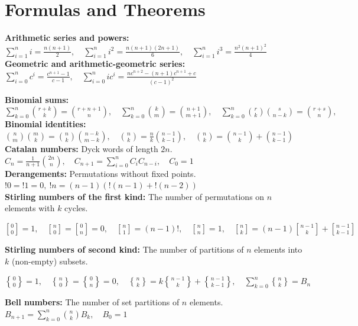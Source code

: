 \documentclass[a4paper,twocolumn]{article}
\newcommand{\stirling}[2]{{#1 \brack #2}}
\newcommand{\stirlingtwo}[2]{{#1 \brace #2}}
\newcommand\disappearingrule{%
	\par %
	\vskip5pt %
	\leaders\vrule width 0.4934\textwidth\vskip0.4pt %
	\nointerlineskip %
	\vskip2pt %
}
\begin{document}
\section{Formulas and Theorems}
{\fontsize{8}{8}

\textbf{Arithmetic series and powers:} $\sum\limits_{i=1}^n i = \frac{n(n+1)}{2}, \quad \sum\limits_{i=1}^n i^2 = \frac{n(n+1)(2n+1)}{6}, \quad \sum\limits_{i=1}^n i^3 = \frac{n^2(n+1)^2}{4}$ \\
\textbf{Geometric and arithmetic-geometric series: } $\sum\limits_{i=0}^n c^i = \frac{c^{n+1} - 1}{c-1}, \quad \sum\limits_{i=0}^n ic^i = \frac{nc^{n+2} - (n+1)c^{n+1} + c}{(c-1)^2}$

\disappearingrule

\textbf{Binomial sums: } $\sum\limits_{k=0}^n \binom{r+k}{k} = \binom{r+n+1}{n}, \quad \sum\limits_{k=0}^n \binom{k}{m} = \binom{n+1}{m+1}, \quad \sum\limits_{k=0}^n \binom{r}{k}\binom{s}{n-k} = \binom{r+s}{n},$ \\
\textbf{Binomial identities: } $\binom{n}{m} \binom{m}{k} = \binom{n}{k} \binom{n-k}{m-k}, \quad \binom{n}{k} = \frac{n}{k} \binom{n - 1}{k - 1}, \quad \binom{n}{k} = \binom{n - 1}{k} + \binom{n - 1}{k - 1}$ \\
\textbf{Catalan numbers: } \textnormal{Dyck words of length $2n$. } $C_n = \frac{1}{n+1} \binom{2n}{n}, \quad C_{n+1} = \sum_{i=0}^n C_i C_{n-i}, \quad C_0 = 1$ \\
\textbf{Derangements: } \textnormal{Permutations without fixed points. } $!0 = !1 = 0,\ !n = (n-1)(!(n-1) + !(n-2))$ \\
\textbf{Stirling numbers of the first kind: } \textnormal{The number of permutations on $n$ elements with $k$ cycles.}
\begin{center}
	$\stirling{0}{0} = 1, \quad \stirling{n}{0} = \stirling{0}{n} = 0, \quad \stirling{n}{1} = (n-1)!, \quad \stirling{n}{n} = 1, \quad \stirling{n}{k} = (n-1)\stirling{n-1}{k} + \stirling{n-1}{k-1}$
\end{center}
\textbf{Stirling numbers of second kind: } \textnormal{The number of partitions of $n$ elements into $k$ (non-empty) subsets.}
\begin{center}
	$\stirlingtwo{0}{0} = 1, \quad \stirlingtwo{n}{0} = \stirlingtwo{0}{n} = 0, \quad \stirlingtwo{n}{k} = k\stirlingtwo{n-1}{k} + \stirlingtwo{n-1}{k-1}, \quad \sum_{k=0}^n \stirlingtwo{n}{k} = B_n$
\end{center}
\textbf{Bell numbers: } \textnormal{The number of set partitions of $n$ elements.} $B_{n+1} = \sum\limits_{k=0}^n \binom{n}{k} B_k, \quad B_0 = 1$  \\
}
\end{document}
